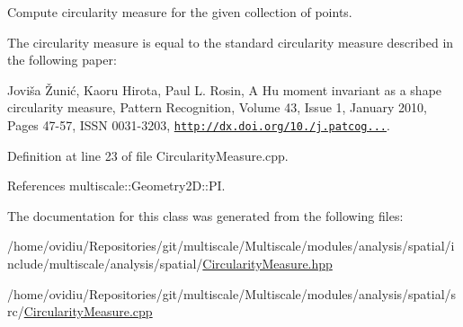 \-Compute circularity measure for the given collection of points. 

\-The circularity measure is equal to the standard circularity measure described in the following paper\-:

\-Joviša Žunić, \-Kaoru \-Hirota, \-Paul \-L. \-Rosin, \-A \-Hu moment invariant as a shape circularity measure, \-Pattern \-Recognition, \-Volume 43, \-Issue 1, \-January 2010, \-Pages 47-\/57, \-I\-S\-S\-N 0031-\/3203, \href{http://dx.doi.org/10.1016/j.patcog.2009.06.017}{\tt http\-://dx.\-doi.\-org/10./j.\-patcog...}. 

\-Definition at line 23 of file \-Circularity\-Measure.\-cpp.



\-References multiscale\-::\-Geometry2\-D\-::\-P\-I.



\-The documentation for this class was generated from the following files\-:\begin{DoxyCompactItemize}
\item 
/home/ovidiu/\-Repositories/git/multiscale/\-Multiscale/modules/analysis/spatial/include/multiscale/analysis/spatial/\hyperlink{CircularityMeasure_8hpp}{\-Circularity\-Measure.\-hpp}\item 
/home/ovidiu/\-Repositories/git/multiscale/\-Multiscale/modules/analysis/spatial/src/\hyperlink{CircularityMeasure_8cpp}{\-Circularity\-Measure.\-cpp}\end{DoxyCompactItemize}
